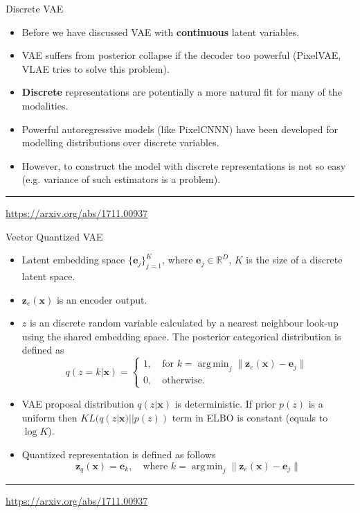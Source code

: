 \documentclass{beamer}
\newcommand{\be}{\mathbf{e}}
\newcommand{\bx}{\mathbf{x}}
\newcommand{\bz}{\mathbf{z}}
\newcommand{\bbR}{\mathbb{R}}
\DeclareMathOperator*{\argmin}{arg\,min}
\begin{document}
\begin{frame}{Discrete VAE}
	\begin{itemize}
		\item Before we have discussed VAE with \textbf{continuous} latent variables.
		\item VAE suffers from posterior collapse if the decoder too powerful (PixelVAE, VLAE tries to solve this problem).
		\item \textbf{Discrete} representations are potentially a more natural fit for many of the modalities.
		\item Powerful autoregressive models (like PixelCNNN) have been developed for modelling distributions over discrete variables.
		\item However, to construct the model with discrete representations is not so easy (e.g. variance of such estimators is a problem).
	\end{itemize}
	\vfill
	\hrule\medskip
	{\scriptsize \href{https://arxiv.org/abs/1711.00937}{https://arxiv.org/abs/1711.00937}} 
\end{frame}
\begin{frame}{Vector Quantized VAE}
	\begin{itemize}
		\item Latent embedding space $\{\be_j\}_{j=1}^K$, where $\be_j \in \bbR^D$, $K$ is the size of a discrete latent space.
		\item $\bz_e(\bx)$ is an encoder output.
		\item $z$ is an discrete random variable calculated by a nearest neighbour look-up using the shared embedding space. The posterior categorical distribution is defined as 
		\[
			q(z = k | \bx) = \begin{cases}
				1 , \quad \text{for } k = \argmin_j \| \bz_e(\bx) - \be_j \| \\
				0, \quad \text{otherwise}.
			\end{cases}
		\]
		
		\item VAE proposal distribution $q(z | \bx)$ is deterministic. If prior $p(z)$ is a uniform then $KL(q(z| \bx) || p(z))$ term in ELBO is constant (equals to $\log K$).
		\item Quantized representation is defined as follows
		\[
			\bz_q(\bx) = \be_k, \quad \text{where } k = \argmin_j \| \bz_e(\bx) - \be_j \| 
		\] 
		
	\end{itemize}
	\vfill
	\hrule\medskip
	{\scriptsize \href{https://arxiv.org/abs/1711.00937}{https://arxiv.org/abs/1711.00937}} 
\end{frame}
\end{document}
